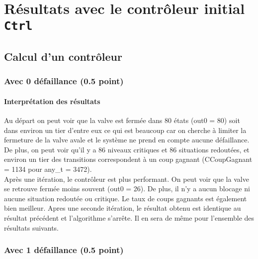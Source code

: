 \documentclass[a4paper]{book}
\begin{document}
\section{Résultats avec le contrôleur initial {\tt Ctrl}}
\subsection{Calcul d'un contrôleur}
\subsubsection{Avec 0 défaillance (0.5 point)}



%
%
\paragraph{Interprétation des résultats}
Au départ on peut voir que la valve est fermée dans 80 états (out0 = 80) 
soit dans environ un tier d'entre eux ce qui est beaucoup car on cherche à limiter la fermeture de la valve avale et le système ne prend en compte aucune défaillance. 
De plus, on peut voir qu'il y a 86 niveaux critiques et 86 situations redoutées, et environ un tier des transitions correspondent à un coup gagnant (CCoupGagnant = 1134 pour any\_t = 3472).\\
Après une itération, le contrôleur est plus performant. On peut voir que la valve se retrouve fermée moins souvent (out0 = 26). De plus, il n'y a aucun blocage 
ni aucune situation redoutée ou critique. Le taux de coups gagnants est également bien meilleur.
Apres une seconde itération, le résultat obtenu est identique au résultat précédent et l'algorithme s'arrête. Il en sera de même pour l'ensemble des résultats suivants.


\subsubsection{Avec 1 défaillance (0.5 point)}




%
\end{document}
